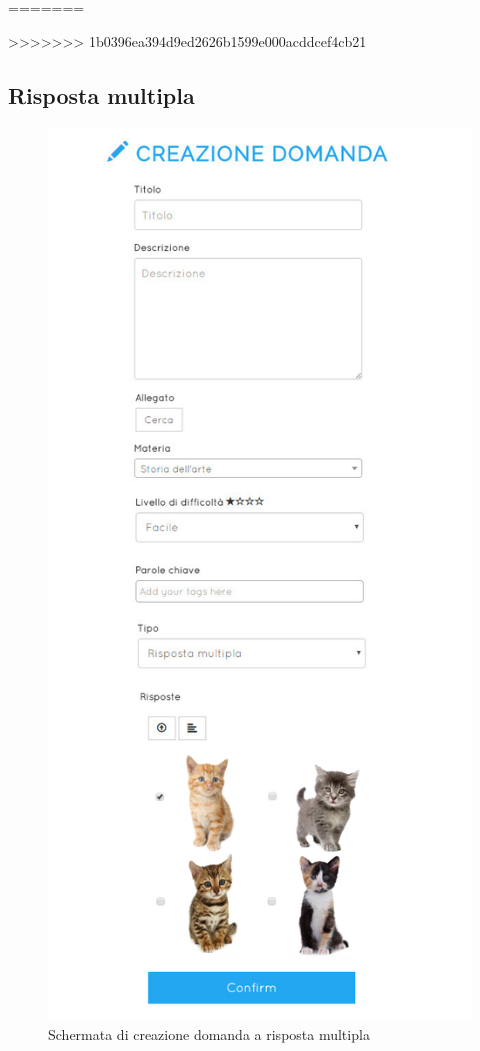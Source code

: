 \documentclass[a4paper, titlepage]{article}
\begin{document}
=======
	 
	 \newpage
>>>>>>> 1b0396ea394d9ed2626b1599e000acddcef4cb21
	 \subsection{Risposta multipla}
	 \begin{figure}[!h]
	 	\centering
	 	\includegraphics[scale=0.33]{Img/screen_CreazioneDomandaRMultipla.png}
	 	\caption{Schermata di creazione domanda a risposta multipla}
	 \end{figure}
\end{document}
